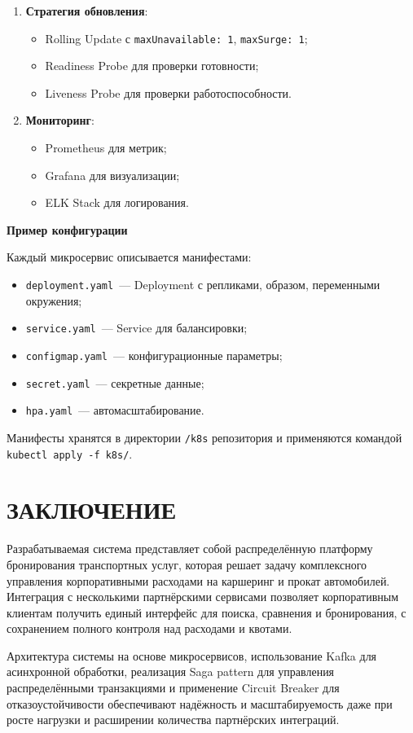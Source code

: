 \documentclass{bmstu}
\begin{document}
\begin{enumerate}
    \item \textbf{Стратегия обновления}:
    \begin{itemize}
        \item Rolling Update с \texttt{maxUnavailable: 1}, \texttt{maxSurge: 1};
        \item Readiness Probe для проверки готовности;
        \item Liveness Probe для проверки работоспособности.
    \end{itemize}
    
    \item \textbf{Мониторинг}:
    \begin{itemize}
        \item Prometheus для метрик;
        \item Grafana для визуализации;
        \item ELK Stack для логирования.
    \end{itemize}
\end{enumerate}

\begin{center}
    \textbf{Пример конфигурации}
\end{center}

Каждый микросервис описывается манифестами:

\begin{itemize}
    \item \texttt{deployment.yaml}~--- Deployment с репликами, образом, переменными окружения;
    \item \texttt{service.yaml}~--- Service для балансировки;
    \item \texttt{configmap.yaml}~--- конфигурационные параметры;
    \item \texttt{secret.yaml}~--- секретные данные;
    \item \texttt{hpa.yaml}~--- автомасштабирование.
\end{itemize}

Манифесты хранятся в директории \texttt{/k8s} репозитория и применяются командой \texttt{kubectl apply -f k8s/}.

\newpage
\chapter*{ЗАКЛЮЧЕНИЕ}

Разрабатываемая система представляет собой распределённую платформу бронирования транспортных услуг, которая решает задачу комплексного управления корпоративными расходами на каршеринг и прокат автомобилей. Интеграция с несколькими партнёрскими сервисами позволяет корпоративным клиентам получить единый интерфейс для поиска, сравнения и бронирования, с сохранением полного контроля над расходами и квотами.

Архитектура системы на основе микросервисов, использование Kafka для асинхронной обработки, реализация Saga pattern для управления распределёнными транзакциями и применение Circuit Breaker для отказоустойчивости обеспечивают надёжность и масштабируемость даже при росте нагрузки и расширении количества партнёрских интеграций.

\makebibliography
\end{document}
